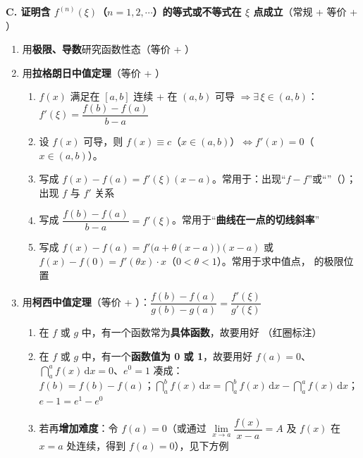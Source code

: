 \documentclass[a4paper,12pt]{article}
\begin{document}
    \begin{minipage}[t]{0.46\textwidth}
        \textbf{C. 证明含 $f^{(n)}(\xi)$（$n = 1, 2, \cdots$）的等式或不等式在 $\xi$ 点成立}（常规 + 等价 + {\color{red}{经典}}）
        \begin{enumerate}[label=(\arabic*), leftmargin=2em, itemsep=0.5em]
            \item 用\textbf{极限、导数}研究函数性态（等价 + {\color{red}{经典}}）
            \item 用\textbf{拉格朗日中值定理}（等价 + {\color{red}{经典}}）
            \begin{enumerate}[label=\alph*., leftmargin=2em, itemsep=0.6em]
                \item $f(x)$ 满足在 $[a, b]$ 连续 + 在 $(a, b)$ 可导 $\Rightarrow \exists\,\xi \in (a, b)$：$f'(\xi) = \dfrac{f(b) - f(a)}{b - a}$
                \item 设 $f(x)$ 可导，则 $f(x) \equiv c$（$x \in (a, b)$）$\Leftrightarrow f'(x) = 0$（$x \in (a, b)$）。{}
                \item 写成 $f(x) - f(a) = f'(\xi)(x - a)$。常用于：出现``$f - f$''或``{\color{red}{$f - 0$}}''（{\color{red}{经典}}）；出现 $f$ 与 $f'$ 关系
                \item 写成 $\dfrac{f(b) - f(a)}{b - a} = f'(\xi)$。常用于``\textbf{曲线在一点的切线斜率}''
                \item 写成 $f(x) - f(a) = f'\bigl(a + \theta(x - a)\bigr)(x - a)$ 或 $f(x) - f(0) = f'(\theta x)\cdot x$（$0 < \theta < 1$）。常用于求中值点，{\color{red}{令 $\xi = a + \theta(x - a)$}} 的极限位置
            \end{enumerate}
            \item 用\textbf{柯西中值定理}（等价 + {\color{red}{经典}}）：$\dfrac{f(b) - f(a)}{g(b) - g(a)} = \dfrac{f'(\xi)}{g'(\xi)}$
            \begin{enumerate}[label=\alph*., leftmargin=2em, itemsep=0.5em]
                \item 在 $f$ 或 $g$ 中，有一个函数常为\textbf{具体函数}，故要用好 {}（红圈标注）
                \item 在 $f$ 或 $g$ 中，有一个\textbf{函数值为 0 或 1}，故要用好 $f(a) = 0$、$\dint_{a}^{a} f(x)\,\mathrm{d}x = 0$、$e^{0} = 1$ 凑成：\\
                      $f(b) = f(b) - f(a)$；\quad $\dint_{a}^{b} f(x)\,\mathrm{d}x = \dint_{a}^{b} f(x)\,\mathrm{d}x - \dint_{a}^{a} f(x)\,\mathrm{d}x$；\quad $e - 1 = e^{1} - e^{0}$
                \item 若再\textbf{增加难度}：令 $f(a) = 0$（或通过 $\lim\limits_{x \to a} \dfrac{f(x)}{x - a} = A$ 及 $f(x)$ 在 $x = a$ 处连续，得到 $f(a) = 0$），见下方例
            \end{enumerate}
        \end{enumerate}
    \end{minipage}
    \hfill
\end{document}
